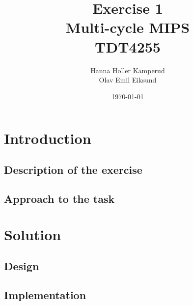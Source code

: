 \documentclass{report}
\title{Exercise 1 \\ Multi-cycle MIPS \\ TDT4255} %
\author{Hanna Holler Kamperud \\ Olav Emil Eiksund} %
\date{\today} %
\begin{document}
\maketitle %

\newpage
\begin{abstract}

\end{abstract}

\tableofcontents


\chapter{Introduction}
\section{Description of the exercise}


\section{Approach to the task}


\chapter{Solution}


\section{Design}


\section{Implementation}


\newpage
\end{document}
